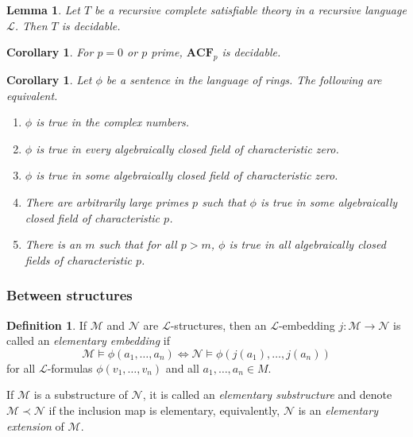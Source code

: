 \documentclass{amsart}
\newtheorem{lemma}[theorem]{Lemma}
\newtheorem{corollary}[theorem]{Corollary}
\theoremstyle{definition}
\newtheorem{definition}[theorem]{Definition}
\numberwithin{equation}{section}
\begin{document}
\begin{lemma}
    Let $T$ be a recursive complete satisfiable theory in a recursive language $\mathcal{L}$. 
    Then $T$ is decidable.
\end{lemma}

\begin{corollary}
    For $p = 0$ or $p$ prime, $\mathbf{ACF}_p$ is decidable.
\end{corollary}

\begin{corollary}
    Let $\phi$ be a sentence in the language of rings.
    The following are equivalent.
    \begin{enumerate}[label = {\roman*)}]
        \item $\phi$ is true in the complex numbers.
        \item $\phi$ is true in every algebraically closed field of characteristic zero.
        \item $\phi$ is true in some algebraically closed field of characteristic zero.
        \item There are arbitrarily large primes $p$ such that $\phi$ is true in some algebraically closed field of characteristic $p$.
        \item There is an $m$ such that for all $p > m$, $\phi$ is true in all algebraically closed fields of characteristic $p$.
    \end{enumerate}
\end{corollary}

\subsubsection{Between structures}
\begin{definition}
    If $\mathcal{M}$ and $\mathcal{N}$ are $\mathcal{L}$-structures,
    then an $\mathcal{L}$-embedding $j: \mathcal{M} \to \mathcal{N}$ is called an \emph{elementary embedding} if 
    \[
    \mathcal{M} \models \phi(a_1,\dots,a_n) \iff \mathcal{N} \models \phi(j(a_1),\dots,j(a_n))
    \] 
    for all $\mathcal{L}$-formulas $\phi(v_1,\dots,v_n)$ and all $a_1,\dots,a_n \in M$.

    If $\mathcal{M}$ is a substructure of $\mathcal{N}$, 
    it is called an \emph{elementary substructure} and 
    denote $\mathcal{M} \prec \mathcal{N}$ if the inclusion map is elementary,
    equivalently, $\mathcal{N}$ is an \emph{elementary extension} of $\mathcal{M}$.
\end{definition}
\end{document}
